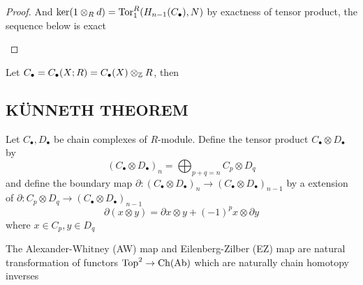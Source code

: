 \documentclass{report}
\begin{document}
\begin{proof}
    And $\ker (1 \otimes_R d) = \operatorname{Tor}^R_1(H_{n-1}(C_\bullet), N)$ by exactness of tensor product, the sequence below is exact

    \begin{center}
    \end{center}   
\end{proof}

\begin{remark}
    Let $C_\bullet = C_\bullet(X; R) = C_\bullet(X) \otimes_{\mathbb{Z}} R$, then
    \begin{center}
    \end{center}
\end{remark}






\subsection{KÜNNETH THEOREM}

\begin{definition}
    Let $C_\bullet, D_\bullet$ be chain complexes of $R$-module. Define the tensor product $C_\bullet \otimes D_\bullet$ by
    $$
        (C_\bullet \otimes D_\bullet)_n = \bigoplus_{p + q = n} C_p \otimes D_q
    $$
    and define the boundary map $\partial: (C_\bullet \otimes D_\bullet)_n \to (C_\bullet \otimes D_\bullet)_{n-1}$ by a extension of $\partial: C_p \otimes D_q \to (C_\bullet \otimes D_\bullet)_{n-1}$ 
    $$
        \partial(x \otimes y) = \partial x \otimes y + (-1)^p x \otimes \partial y
    $$
    where $x \in C_p, y \in D_q$
\end{definition}

\begin{theorem}
    The Alexander-Whitney (AW) map and Eilenberg-Zilber (EZ) map are natural transformation of functors $\operatorname{Top}^2 \to \operatorname{Ch}(\operatorname{Ab})$ which are naturally chain homotopy inverses
    \begin{center}
    \end{center}
\end{theorem}
\end{document}
